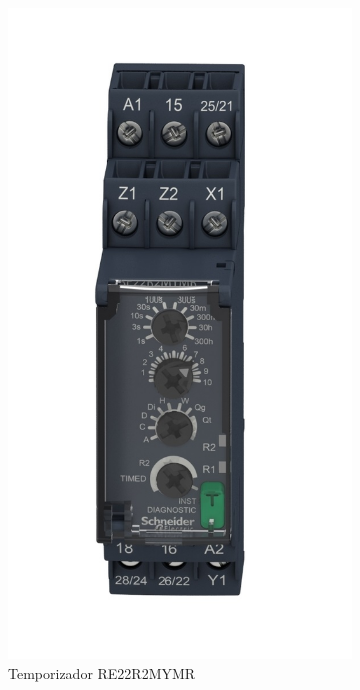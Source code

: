 \begin{figure}
	\centering
	\begin{subfigure}[b]{0.3\textwidth}
		\centering
		\includegraphics[width=\textwidth]{fig/RE22R2MYMR}
		\caption{Temporizador RE22R2MYMR \cite{Scheneider3} }
		\label{fig:imagen}
	\end{subfigure}
	\hfill
	\begin{subfigure}[b]{0.5\textwidth}

\end{subfigure}
\end{figure}
